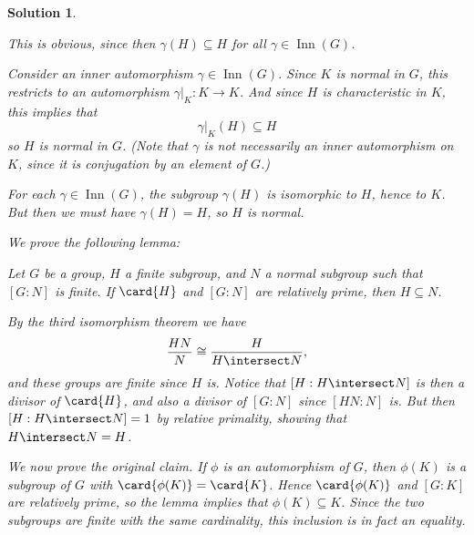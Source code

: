 \documentclass[article, a4paper, 11pt, oneside]{memoir}
\numberwithin{equation}{chapter}
\theoremstyle{nonumberplain}
\newtheorem{solution}{Solution}
\DeclareMathOperator{\Inn}{Inn}
\newenvironment{displaytheorem}{%
	\begin{displayquote}\itshape%
}{%
	\end{displayquote}%
}
\begin{document}
\begin{solution}
\begin{solutionsec}
    \item This is obvious, since then $\gamma(H) \subseteq H$ for all $\gamma \in \Inn(G)$.

    \item Consider an inner automorphism $\gamma \in \Inn(G)$. Since $K$ is normal in $G$, this restricts to an automorphism $\gamma|_K \colon K \to K$. And since $H$ is characteristic in $K$, this implies that
    \begin{equation*}
        \gamma|_K(H)
            \subseteq H
    \end{equation*}
    so $H$ is normal in $G$. (Note that $\gamma$ is not necessarily an inner automorphism on $K$, since it is conjugation by an element of $G$.)

    \item For each $\gamma \in \Inn(G)$, the subgroup $\gamma(H)$ is isomorphic to $H$, hence to $K$. But then we must have $\gamma(H) = H$, so $H$ is normal.

    \item We prove the following lemma:
    \begin{displaytheorem}
        Let $G$ be a group, $H$ a finite subgroup, and $N$ a normal subgroup such that $[G : N]$ is finite. If $\card{H}$ and $[G : N]$ are relatively prime, then $H \subseteq N$.
    \end{displaytheorem}
    By the third isomorphism theorem we have
    \begin{equation*}
        \frac{HN}{N}
            \cong
            \frac{H}{H \intersect N},
    \end{equation*}
    and these groups are finite since $H$ is. Notice that $[H : H \intersect N]$ is then a divisor of $\card{H}$, and also a divisor of $[G : N]$ since $[HN : N]$ is. But then $[H : H \intersect N] = 1$ by relative primality, showing that $H \intersect N = H$.

    We now prove the original claim. If $\phi$ is an automorphism of $G$, then $\phi(K)$ is a subgroup of $G$ with $\card{\phi(K)} = \card{K}$. Hence $\card{\phi(K)}$ and $[G : K]$ are relatively prime, so the lemma implies that $\phi(K) \subseteq K$. Since the two subgroups are finite with the same cardinality, this inclusion is in fact an equality.
\end{solutionsec}
\end{solution}
\end{document}

